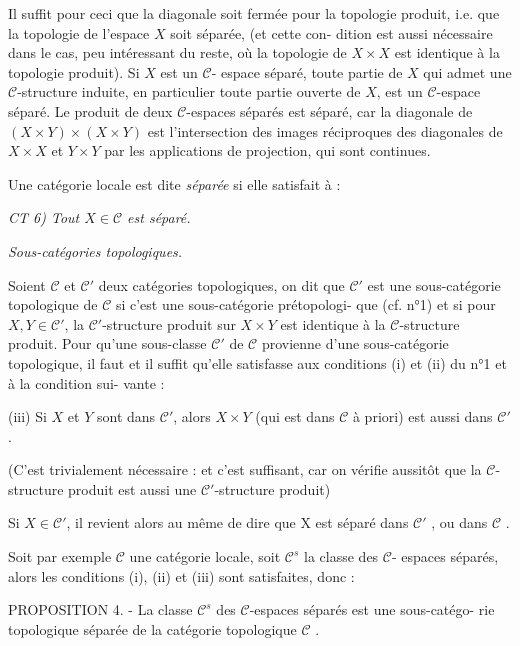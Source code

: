 Il suffit pour ceci que la diagonale soit fermée pour la topologie
produit, i.e. que la topologie de l'espace $X$ soit séparée, (et cette con-
dition est aussi nécessaire dans le cas, peu intéressant du reste, où la
topologie de $X \times X$ est identique à la topologie produit). Si $X$ est un $\mathcal{C}$-
espace séparé, toute partie de $X$ qui admet une $\mathcal{C}$-structure induite,
en particulier toute partie ouverte de $X$, est un $\mathcal{C}$-espace séparé. Le
produit de deux $\mathcal{C}$-espaces séparés est séparé, car la diagonale de
$(X \times Y) \times (X \times Y)$ est l'intersection des images réciproques des diagonales
de $X \times X$ et $Y \times Y$ par les applications de projection, qui sont continues.

Une catégorie locale est dite \emph{séparée} si elle satisfait à :

\emph{CT 6) Tout $X \in \mathcal{C}$ est séparé.}

\emph{Sous-catégories topologiques.}

Soient $\mathcal{C}$ et $\mathcal{C}'$ deux catégories topologiques, on dit que $\mathcal{C}'$ est une
sous-catégorie topologique de $\mathcal{C}$ si c'est une sous-catégorie prétopologi-
que (cf. n°1) et si pour $X, Y \in \mathcal{C}'$, la $\mathcal{C}'$-structure produit sur $X \times Y$ est
identique à la $\mathcal{C}$-structure produit. Pour qu'une sous-classe $\mathcal{C}'$ de $\mathcal{C}$
provienne d'une sous-catégorie topologique, il faut et il suffit qu'elle
satisfasse aux conditions (i) et (ii) du n°1 et à la condition sui-
vante :

(iii) Si $X$ et $Y$ sont dans $\mathcal{C}'$, alors $X \times Y$ (qui est dans $\mathcal{C}$ à priori) est
aussi dans $\mathcal{C}'$.

(C'est trivialement nécessaire : et c'est suffisant, car on vérifie
aussitôt que la $\mathcal{C}$-structure produit est aussi une $\mathcal{C}'$-structure produit)

\newpage



Si $X \in \mathcal{C}'$, il revient alors au même de dire que X est séparé dans $\mathcal{C}'$ ,
ou dans $\mathcal{C}$ .

Soit par exemple $\mathcal{C}$ une catégorie locale, soit $\mathcal{C}^s$ la classe des $\mathcal{C}$-
espaces séparés, alors les conditions (i), (ii) et (iii) sont satisfaites,
donc :

PROPOSITION 4. - La classe $\mathcal{C}^s$ des $\mathcal{C}$-espaces séparés est une sous-catégo-
rie topologique séparée de la catégorie topologique $\mathcal{C}$ .

